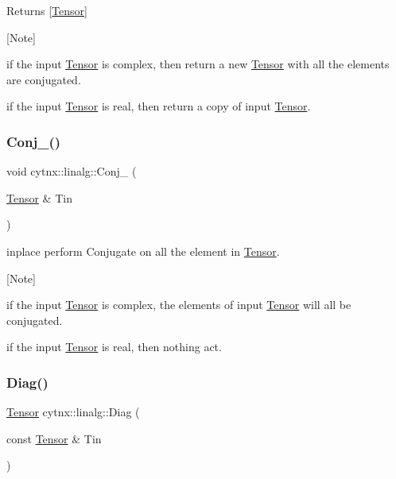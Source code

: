 \begin{DoxyReturn}{Returns}
\mbox{[}\hyperlink{classcytnx_1_1Tensor}{Tensor}\mbox{]}
\end{DoxyReturn}
\mbox{[}Note\mbox{]}
\begin{DoxyEnumerate}
\item if the input \hyperlink{classcytnx_1_1Tensor}{Tensor} is complex, then return a new \hyperlink{classcytnx_1_1Tensor}{Tensor} with all the elements are conjugated.
\item if the input \hyperlink{classcytnx_1_1Tensor}{Tensor} is real, then return a copy of input \hyperlink{classcytnx_1_1Tensor}{Tensor}. 
\end{DoxyEnumerate}\mbox{\label{namespacecytnx_1_1linalg_adc3233bf8bc3eb6a435340f912412801}} 
\subsubsection{\texorpdfstring{Conj\+\_\+()}{Conj\_()}}
{\footnotesize\ttfamily void cytnx\+::linalg\+::\+Conj\+\_\+ (\begin{DoxyParamCaption}\item[{\hyperlink{classcytnx_1_1Tensor}{Tensor} \&}]{Tin }\end{DoxyParamCaption})}



inplace perform Conjugate on all the element in \hyperlink{classcytnx_1_1Tensor}{Tensor}. 

\mbox{[}Note\mbox{]}
\begin{DoxyEnumerate}
\item if the input \hyperlink{classcytnx_1_1Tensor}{Tensor} is complex, the elements of input \hyperlink{classcytnx_1_1Tensor}{Tensor} will all be conjugated.
\item if the input \hyperlink{classcytnx_1_1Tensor}{Tensor} is real, then nothing act. 
\end{DoxyEnumerate}\mbox{\label{namespacecytnx_1_1linalg_a5913f0bdd6cc130aeb927f42a874a149}} 
\subsubsection{\texorpdfstring{Diag()}{Diag()}}
{\footnotesize\ttfamily \hyperlink{classcytnx_1_1Tensor}{Tensor} cytnx\+::linalg\+::\+Diag (\begin{DoxyParamCaption}\item[{const \hyperlink{classcytnx_1_1Tensor}{Tensor} \&}]{Tin }\end{DoxyParamCaption})}



